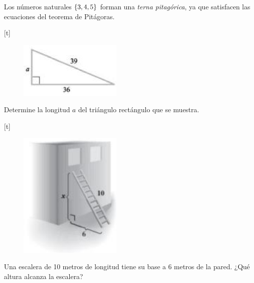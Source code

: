 {}
	Los números naturales $\left\{ 3,4,5 \right\}$ forman una \emph{terna pitagórica}, ya que satisfacen las ecuaciones del teorema de Pitágoras. 

[t]{}
	\begin{problema}
		\label{exmp:9408}
		\begin{figure}
			\centering
			\includegraphics[width=5cm,keepaspectratio=true]{./trig/trig9450.png}
			\label{fig:9450}
		\end{figure}
		
		Determine la longitud $a$ del triángulo rectángulo que se muestra.
	\end{problema}
	

[t]{}
	\begin{problema}
		\label{exmp:9409}
		\begin{figure}
			\centering
			\includegraphics[width=5cm,keepaspectratio=true]{./trig/trig9451.png}
			\label{fig:9451}
		\end{figure}
		Una escalera de 10 metros de longitud tiene su base a 6 metros de la pared. ¿Qué altura alcanza la escalera?
	\end{problema}
	


